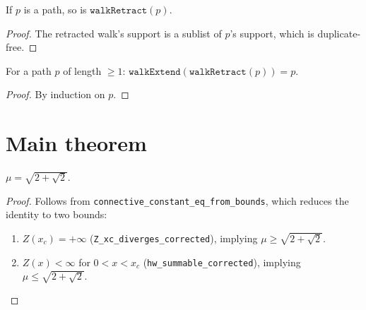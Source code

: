 \begin{lemma}\label{lem:walkRetract_isPath}

\begin{lemma}\label{lem:walkRetract_isPath}
\leanok
{}
  If $p$ is a path, so is $\texttt{walkRetract}(p)$.
\end{lemma}
\begin{proof}
\leanok
  The retracted walk's support is a sublist of $p$'s support,
  which is duplicate-free.
\end{proof}

\begin{lemma}[Retract then extend = identity]\label{lem:walkRetract_extend}
\leanok
{}
  For a path $p$ of length $\geq 1$:
  $\texttt{walkExtend}(\texttt{walkRetract}(p)) = p$.
\end{lemma}
\begin{proof}
\leanok
  By induction on $p$.
\end{proof}

\section{Main theorem}

\begin{theorem}\label{thm:main_corrected}
  $\mu = \sqrt{2+\sqrt{2}}$.
\end{theorem}
\begin{proof}
  Follows from \texttt{connective\_constant\_eq\_from\_bounds},
  which reduces the identity to two bounds:
  \begin{enumerate}
  \item $Z(x_c) = +\infty$ (\texttt{Z\_xc\_diverges\_corrected}),
        implying $\mu \geq \sqrt{2+\sqrt{2}}$.
  \item $Z(x) < \infty$ for $0 < x < x_c$
        (\texttt{hw\_summable\_corrected}),
        implying $\mu \leq \sqrt{2+\sqrt{2}}$.
  \end{enumerate}


\end{proof}
\end{lemma}
